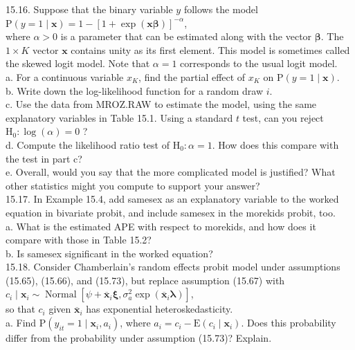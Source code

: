 \documentclass[10pt]{article}
\begin{document}
15.16. Suppose that the binary variable $y$ follows the model\\
$\mathrm{P}(y=1 \mid \mathbf{x})=1-[1+\exp (\mathbf{x} \boldsymbol{\beta})]^{-\alpha}$,\\
where $\alpha>0$ is a parameter that can be estimated along with the vector $\boldsymbol{\beta}$. The $1 \times K$ vector $\mathbf{x}$ contains unity as its first element. This model is sometimes called the skewed logit model. Note that $\alpha=1$ corresponds to the usual logit model.\\
a. For a continuous variable $x_{K}$, find the partial effect of $x_{K}$ on $\mathrm{P}(y=1 \mid \mathbf{x})$.\\
b. Write down the log-likelihood function for a random draw $i$.\\
c. Use the data from MROZ.RAW to estimate the model, using the same explanatory variables in Table 15.1. Using a standard $t$ test, can you reject $\mathrm{H}_{0}: \log (\alpha)=0$ ?\\
d. Compute the likelihood ratio test of $\mathrm{H}_{0}: \alpha=1$. How does this compare with the test in part c?\\
e. Overall, would you say that the more complicated model is justified? What other statistics might you compute to support your answer?\\
15.17. In Example 15.4, add samesex as an explanatory variable to the worked equation in bivariate probit, and include samesex in the morekids probit, too.\\
a. What is the estimated APE with respect to morekids, and how does it compare with those in Table 15.2?\\
b. Is samesex significant in the worked equation?\\
15.18. Consider Chamberlain's random effects probit model under assumptions (15.65), (15.66), and (15.73), but replace assumption (15.67) with\\
$c_{i} \mid \mathbf{x}_{i} \sim \operatorname{Normal}\left[\psi+\overline{\mathbf{x}}_{i} \boldsymbol{\xi}, \sigma_{a}^{2} \exp \left(\overline{\mathbf{x}}_{i} \boldsymbol{\lambda}\right)\right]$,\\
so that $c_{i}$ given $\overline{\mathbf{x}}_{i}$ has exponential heteroskedasticity.\\
a. Find $\mathrm{P}\left(y_{i t}=1 \mid \mathbf{x}_{i}, a_{i}\right)$, where $a_{i}=c_{i}-\mathrm{E}\left(c_{i} \mid \mathbf{x}_{i}\right)$. Does this probability differ from the probability under assumption (15.73)? Explain.\\
\end{document}

